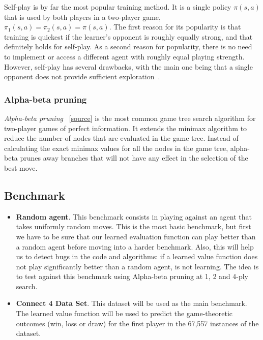 \documentclass{article}
\newcommand{\GithubURL}[1]{[\href{https://github.com/davidrobles/mlnd-capstone-code/blob/master/#1}{source}]}
\begin{document}
Self-play is by far the most popular training method. It is a single policy $\pi(s,a)$ that is used
by both players in a two-player game, $\pi_1(s,a) = \pi_2(s,a) = \pi(s,a)$. The first reason for its
popularity is that training is quickest if the learner's opponent is roughly equally strong, and
that definitely holds for self-play. As a second reason for popularity, there is no need to
implement or access a different agent with roughly equal playing strength. However, self-play has
several drawbacks, with the main one being that a single opponent does not provide sufficient
exploration~\citep{Szita2011RLGames}.

\subsubsection{Alpha-beta pruning}

\emph{Alpha-beta pruning}~\citep{Knuth1975AB} \GithubURL{capstone/game/players/alphabeta.py} is the
most common game tree search algorithm for two-player games of perfect information. It extends the
minimax algorithm to reduce the number of nodes that are evaluated in the game tree. Instead of
calculating the exact minimax values for all the nodes in the game tree, alpha-beta prunes away
branches that will not have any effect in the selection of the best move.

\subsection{Benchmark}
\label{sec:benchmark}

\begin{itemize}

    \item \textbf{Random agent}. This benchmark consists in playing against an agent that takes
        uniformly random moves. This is the most basic benchmark, but first we have to be sure that
        our learned evaluation function can play better than a random agent before moving into a
        harder benchmark. Also, this will help us to detect bugs in the code and algorithms: if a
        learned value function does not play significantly better than a random agent, is not
        learning. The idea is to test against this benchmark using Alpha-beta pruning at 1, 2 and
        4-ply search.

    \item \textbf{Connect 4 Data Set}. This dataset will be used as the main benchmark. The learned
        value function will be used to predict the game-theoretic outcomes (win, loss or draw) for
        the first player in the 67,557 instances of the dataset.

\end{itemize}
\end{document}
